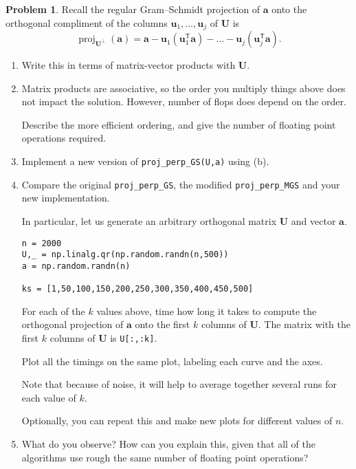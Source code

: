 \documentclass[12pt]{article}
\theoremstyle{definition}
\newtheorem{problem}{Problem}
\renewcommand{\vec}{\mathbf}
\newcommand{\T}{\mathsf{T}}
\begin{document}
\begin{problem}
    Recall the regular Gram--Schmidt projection of $\vec{a}$ onto the orthogonal compliment of the columns $\vec{u}_1, \ldots, \vec{u}_j$ of $\vec{U}$ is
    \[
        \operatorname{proj}_{\vec{U}^\perp}(\vec{a}) = \vec{a} - \vec{u}_1 (\vec{u}_1^\T \vec{a}) - \ldots - \vec{u}_j (\vec{u}_j^\T \vec{a}).
    \]
    \begin{enumerate}
        \item Write this in terms of matrix-vector products with $\vec{U}$.
        \item Matrix products are associative, so the order you multiply things above does not impact the solution. 
            However, number of flops does depend on the order.

            Describe the more efficient ordering, and give the number of floating point operations required.

        \item Implement a new version of \lstinline{proj_perp_GS(U,a)} using (b).

        \item Compare the original \lstinline{proj_perp_GS}, the modified \lstinline{proj_perp_MGS} and your new implementation.

            In particular, let us generate an arbitrary orthogonal matrix $\vec{U}$ and vector $\vec{a}$.
\begin{lstlisting}
n = 2000
U,_ = np.linalg.qr(np.random.randn(n,500))
a = np.random.randn(n)

ks = [1,50,100,150,200,250,300,350,400,450,500]
\end{lstlisting}

            For each of the $k$ values above, time how long it takes to compute the orthogonal projection of $\vec{a}$ onto the first $k$ columns of $\vec{U}$.
            The matrix with the first $k$ columns of $\vec{U}$ is \lstinline{U[:,:k]}.

            Plot all the timings on the same plot, labeling each curve and the axes.

            Note that because of noise, it will help to average together several runs for each value of $k$. 

            Optionally, you can repeat this and make new plots for different values of $n$.

        \item What do you observe? How can you explain this, given that all of the algorithms use rough the same number of floating point operations?


    \end{enumerate}
\end{problem}
\end{document}
